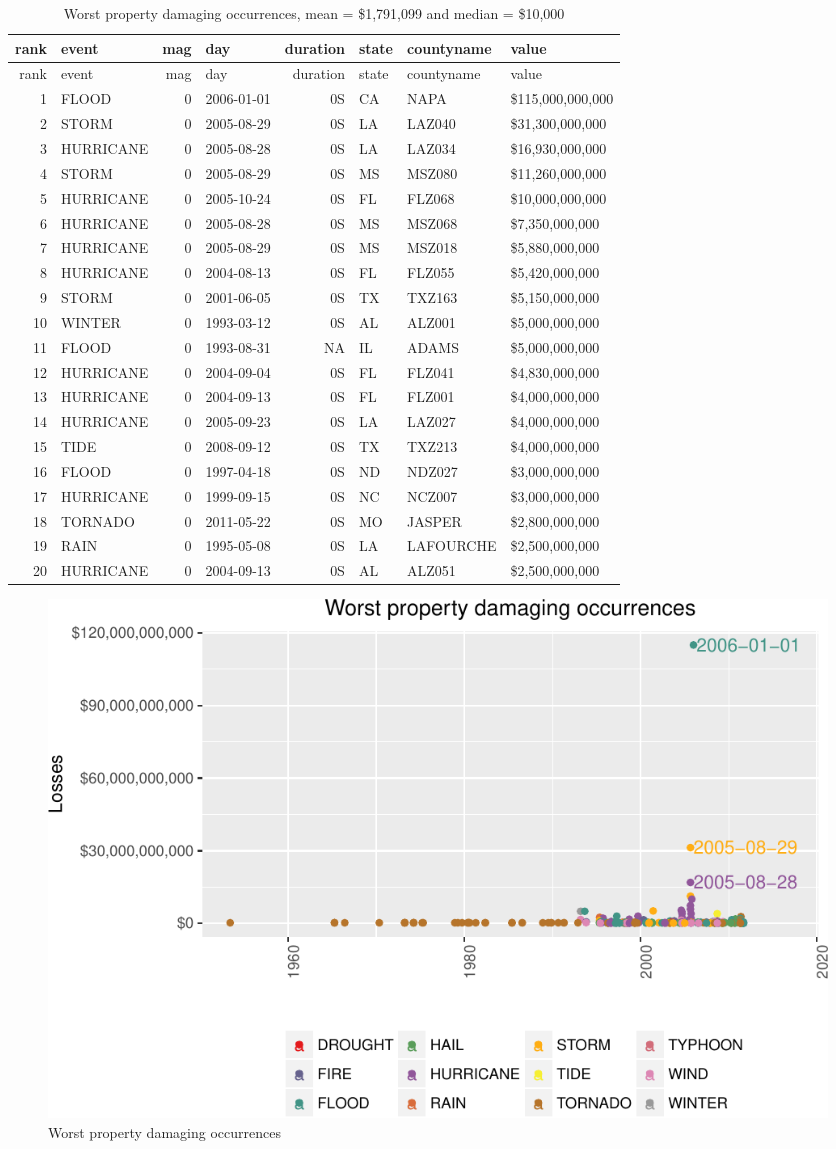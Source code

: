 \documentclass[]{article}
\begin{document}
\begin{longtable}[]{@{}rlrlrlll@{}}
\caption{Worst property damaging occurrences, mean = \$1,791,099 and
median = \$10,000}\tabularnewline
\toprule
rank & event & mag & day & duration & state & countyname &
value\tabularnewline
\midrule
\endfirsthead
\toprule
rank & event & mag & day & duration & state & countyname &
value\tabularnewline
\midrule
\endhead
1 & FLOOD & 0 & 2006-01-01 & 0S & CA & NAPA &
\$115,000,000,000\tabularnewline
2 & STORM & 0 & 2005-08-29 & 0S & LA & LAZ040 &
\$31,300,000,000\tabularnewline
3 & HURRICANE & 0 & 2005-08-28 & 0S & LA & LAZ034 &
\$16,930,000,000\tabularnewline
4 & STORM & 0 & 2005-08-29 & 0S & MS & MSZ080 &
\$11,260,000,000\tabularnewline
5 & HURRICANE & 0 & 2005-10-24 & 0S & FL & FLZ068 &
\$10,000,000,000\tabularnewline
6 & HURRICANE & 0 & 2005-08-28 & 0S & MS & MSZ068 &
\$7,350,000,000\tabularnewline
7 & HURRICANE & 0 & 2005-08-29 & 0S & MS & MSZ018 &
\$5,880,000,000\tabularnewline
8 & HURRICANE & 0 & 2004-08-13 & 0S & FL & FLZ055 &
\$5,420,000,000\tabularnewline
9 & STORM & 0 & 2001-06-05 & 0S & TX & TXZ163 &
\$5,150,000,000\tabularnewline
10 & WINTER & 0 & 1993-03-12 & 0S & AL & ALZ001 &
\$5,000,000,000\tabularnewline
11 & FLOOD & 0 & 1993-08-31 & NA & IL & ADAMS &
\$5,000,000,000\tabularnewline
12 & HURRICANE & 0 & 2004-09-04 & 0S & FL & FLZ041 &
\$4,830,000,000\tabularnewline
13 & HURRICANE & 0 & 2004-09-13 & 0S & FL & FLZ001 &
\$4,000,000,000\tabularnewline
14 & HURRICANE & 0 & 2005-09-23 & 0S & LA & LAZ027 &
\$4,000,000,000\tabularnewline
15 & TIDE & 0 & 2008-09-12 & 0S & TX & TXZ213 &
\$4,000,000,000\tabularnewline
16 & FLOOD & 0 & 1997-04-18 & 0S & ND & NDZ027 &
\$3,000,000,000\tabularnewline
17 & HURRICANE & 0 & 1999-09-15 & 0S & NC & NCZ007 &
\$3,000,000,000\tabularnewline
18 & TORNADO & 0 & 2011-05-22 & 0S & MO & JASPER &
\$2,800,000,000\tabularnewline
19 & RAIN & 0 & 1995-05-08 & 0S & LA & LAFOURCHE &
\$2,500,000,000\tabularnewline
20 & HURRICANE & 0 & 2004-09-13 & 0S & AL & ALZ051 &
\$2,500,000,000\tabularnewline
\bottomrule
\end{longtable}

\begin{figure}[htbp]
\centering
\includegraphics{readme_files/figure-latex/prop-single-plot-1.pdf}
\caption{Worst property damaging occurrences}
\end{figure}
\end{document}
